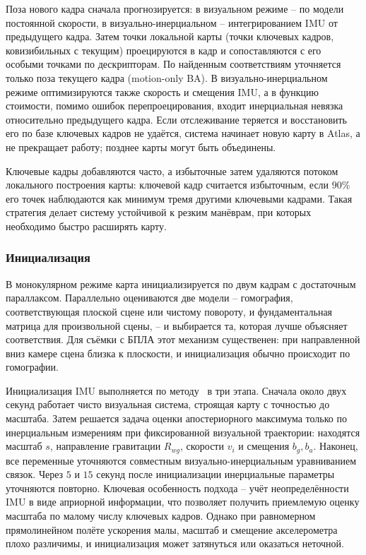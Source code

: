     Поза нового кадра сначала прогнозируется: в визуальном режиме -- по модели постоянной скорости, в визуально-инерциальном -- интегрированием IMU от предыдущего кадра.
    Затем точки локальной карты (точки ключевых кадров, ковизибильных с текущим) проецируются в кадр и сопоставляются с его особыми точками по дескрипторам.
    По найденным соответствиям уточняется только поза текущего кадра (motion-only BA).
    В визуально-инерциальном режиме оптимизируются также скорость и смещения IMU, а в функцию стоимости, помимо ошибок перепроецирования, входит инерциальная невязка относительно предыдущего кадра.
    Если отслеживание теряется и восстановить его по базе ключевых кадров не удаётся, система начинает новую карту в Atlas, а не прекращает работу; позднее карты могут быть объединены.

    Ключевые кадры добавляются часто, а избыточные затем удаляются потоком локального построения карты: ключевой кадр считается избыточным, если $90\%$ его точек наблюдаются как минимум тремя другими ключевыми кадрами.
    Такая стратегия делает систему устойчивой к резким манёврам, при которых необходимо быстро расширять карту.

    \subsubsection{Инициализация}
    В монокулярном режиме карта инициализируется по двум кадрам с достаточным параллаксом.
    Параллельно оцениваются две модели -- гомография, соответствующая плоской сцене или чистому повороту, и фундаментальная матрица для произвольной сцены, -- и выбирается та, которая лучше объясняет соответствия.
    Для съёмки с БПЛА этот механизм существенен: при направленной вниз камере сцена близка к плоскости, и инициализация обычно происходит по гомографии.

    Инициализация IMU выполняется по методу~\cite{orbslam3_init} в три этапа.
    Сначала около двух секунд работает чисто визуальная система, строящая карту с точностью до масштаба.
    Затем решается задача оценки апостериорного максимума только по инерциальным измерениям при фиксированной визуальной траектории: находятся масштаб $s$, направление гравитации $R_{wg}$, скорости $v_i$ и смещения $b_g, b_a$.
    Наконец, все переменные уточняются совместным визуально-инерциальным уравниванием связок.
    Через $5$ и $15$ секунд после инициализации инерциальные параметры уточняются повторно.
    Ключевая особенность подхода -- учёт неопределённости IMU в виде априорной информации, что позволяет получить приемлемую оценку масштаба по малому числу ключевых кадров.
    Однако при равномерном прямолинейном полёте ускорения малы, масштаб и смещение акселерометра плохо различимы, и инициализация может затянуться или оказаться неточной.

